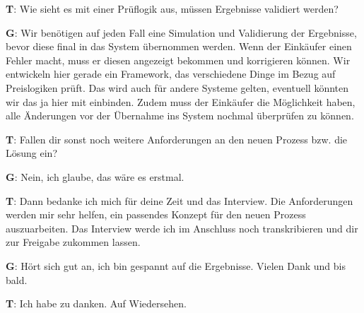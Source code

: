 \begin{list}{X:}{\setlength{\labelsep}{5mm}}
 \item[\textbf{T}:] Wie sieht es mit einer Prüflogik aus, müssen Ergebnisse validiert werden?
 \item[\textbf{G}:] Wir benötigen auf jeden Fall eine Simulation und Validierung der Ergebnisse, bevor diese final in das System übernommen werden. Wenn der Einkäufer einen Fehler macht, muss er diesen angezeigt bekommen und korrigieren können. Wir entwickeln hier gerade ein Framework, das verschiedene Dinge im Bezug auf Preislogiken prüft. Das wird auch für andere Systeme gelten, eventuell könnten wir das ja hier mit einbinden. Zudem muss der Einkäufer die Möglichkeit haben, alle Änderungen vor der Übernahme ins System nochmal überprüfen zu können.
 \item[\textbf{T}:] Fallen dir sonst noch weitere Anforderungen an den neuen Prozess bzw. die Lösung ein?
 \item[\textbf{G}:] Nein, ich glaube, das wäre es erstmal.
 \item[\textbf{T}:] Dann bedanke ich mich für deine Zeit und das Interview. Die Anforderungen werden mir sehr helfen, ein passendes Konzept für den neuen Prozess auszuarbeiten. Das Interview werde ich im Anschluss noch transkribieren und dir zur Freigabe zukommen lassen.
 \item[\textbf{G}:] Hört sich gut an, ich bin gespannt auf die Ergebnisse. Vielen Dank und bis bald.
 \item[\textbf{T}:] Ich habe zu danken. Auf Wiedersehen.     
\end{list}